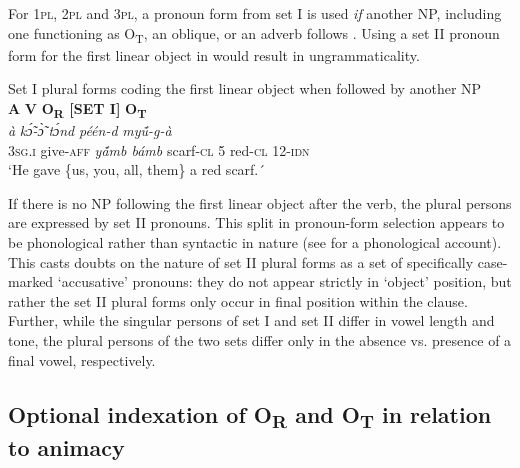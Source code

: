 \documentclass[output=paper]{langsci/langscibook}
\begin{document}
 

   
    

For 1\textsc{pl}, 2\textsc{pl} and 3\textsc{pl}, a pronoun form from set I is used \textit{if} another NP, including one functioning as O\textsubscript{T}, an oblique, or an adverb follows . Using a set II pronoun form for the first linear object in  would result in ungrammaticality.


\ea\label{ex:fig:2.pacchiarotti}
{  Set I plural forms coding the first linear object when followed by another NP}\\
\glll 
  \textbf{A}  \textbf{V}  \textbf{O\textsubscript{R} [SET I]}  \textbf{O\textsubscript{T}}\\
\textit{à}   \textit{k\'{\~ɔ}-\`{\~ɔ}}    \textit{t\'{ɔ}nd}    \textit{péén-d}  \textit{my\'{\~u}-g-à}\\
 {3}\textsc{sg.i}  give-\textsc{aff}  \textit{y\'{\~a}mb bámb}   scarf-\textsc{cl} {5}   red-\textsc{cl} {12}-\textsc{idn}\\
\glt `He gave \{us, you, all, them\} a red scarf.´
\z

If there is no NP following the first linear object after the verb, the plural persons are expressed by set II pronouns. This split in pronoun-form selection appears to be phonological rather than syntactic in nature (see \citealt{peterson1971} for a phonological account). This casts doubts on the nature of set II plural forms as a set of specifically case-marked `accusative' pronouns: they do not appear strictly in `object' position, but rather the set II plural forms only occur in final position within the clause. Further, while the singular persons of set I and set II differ in vowel length and tone, the plural persons of the two sets differ only in the absence vs. presence of a final vowel, respectively. 

\subsection{Optional indexation of O\textsubscript{R} and O\textsubscript{T} in relation to animacy}\label{§4.4:optional.pacchiarotti}
\end{document}
